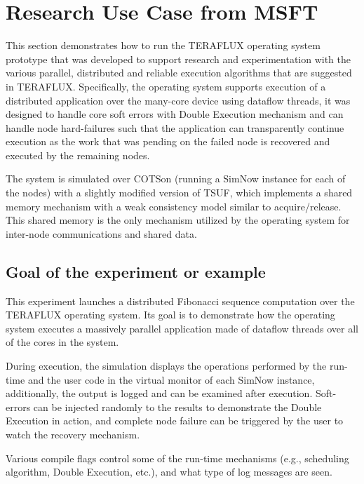 \documentclass[a4paper]{article}
\begin{document}
\section[Research Use Case from MSFT]{Research Use Case from MSFT}
{
This section demonstrates how to run the TERAFLUX operating system
prototype that was developed to support research and experimentation
with the various parallel, distributed and reliable execution
algorithms that are suggested in TERAFLUX. Specifically, the operating
system supports execution of a distributed application over the
many-core device using dataflow threads, it was designed to handle core
soft errors with Double Execution mechanism and can handle node
hard-failures such that the application can transparently continue
execution as the work that was pending on the failed node is recovered
and executed by the remaining nodes.}

{
The system is simulated over COTSon (running a SimNow instance for each
of the nodes) with a slightly modified version of TSUF, which
implements a shared memory mechanism with a weak consistency model
similar to acquire/release. This shared memory is the only mechanism
utilized by the operating system for inter-node communications and
shared data.}

\subsection[Goal of the experiment or example]{Goal of the experiment or
example}
{
This experiment launches a distributed Fibonacci sequence computation
over the TERAFLUX operating system. Its goal is to demonstrate how the
operating system executes a massively parallel application made of
dataflow threads over all of the cores in the system.}

{
During execution, the simulation displays the operations performed by
the run-time and the user code in the virtual monitor of each SimNow
instance, additionally, the output is logged and can be examined after
execution. Soft-errors can be injected randomly to the results to
demonstrate the Double Execution in action, and complete node failure
can be triggered by the user to watch the recovery mechanism.}

{
Various compile flags control some of the run-time mechanisms (e.g.,
scheduling algorithm, Double Execution, etc.), and what type of log
messages are seen.}
\end{document}
